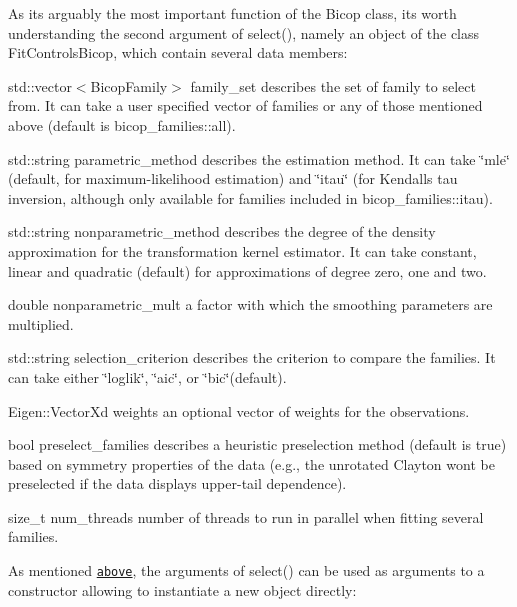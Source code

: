 As it\textquotesingle{}s arguably the most important function of the {\ttfamily Bicop} class, it\textquotesingle{}s worth understanding the second argument of {\ttfamily select()}, namely an object of the class {\ttfamily Fit\+Controls\+Bicop}, which contain several data members\+:
\begin{DoxyItemize}
\item {\ttfamily std\+::vector$<$Bicop\+Family$>$ family\+\_\+set} describes the set of family to select from. It can take a user specified vector of families or any of those mentioned above (default is {\ttfamily bicop\+\_\+families\+::all}).
\item {\ttfamily std\+::string parametric\+\_\+method} describes the estimation method. It can take {\ttfamily \char`\"{}mle\char`\"{}} (default, for maximum-\/likelihood estimation) and {\ttfamily \char`\"{}itau\char`\"{}} (for Kendall\textquotesingle{}s tau inversion, although only available for families included in {\ttfamily bicop\+\_\+families\+::itau}).
\item {\ttfamily std\+::string nonparametric\+\_\+method} describes the degree of the density approximation for the transformation kernel estimator. It can take {\ttfamily constant}, {\ttfamily linear} and {\ttfamily quadratic} (default) for approximations of degree zero, one and two.
\item {\ttfamily double nonparametric\+\_\+mult} a factor with which the smoothing parameters are multiplied.
\item {\ttfamily std\+::string selection\+\_\+criterion} describes the criterion to compare the families. It can take either {\ttfamily \char`\"{}loglik\char`\"{}}, {\ttfamily \char`\"{}aic\char`\"{}}, or {\ttfamily \char`\"{}bic\char`\"{}}(default).
\item {\ttfamily Eigen\+::\+Vector\+Xd weights} an optional vector of weights for the observations.
\item {\ttfamily bool preselect\+\_\+families} describes a heuristic preselection method (default is {\ttfamily true}) based on symmetry properties of the data (e.\+g., the unrotated Clayton won\textquotesingle{}t be preselected if the data displays upper-\/tail dependence).
\item {\ttfamily size\+\_\+t num\+\_\+threads} number of threads to run in parallel when fitting several families.
\end{DoxyItemize}

As mentioned \href{#bicop-custom}{\tt above}, the arguments of {\ttfamily select()} can be used as arguments to a constructor allowing to instantiate a new object directly\+:


